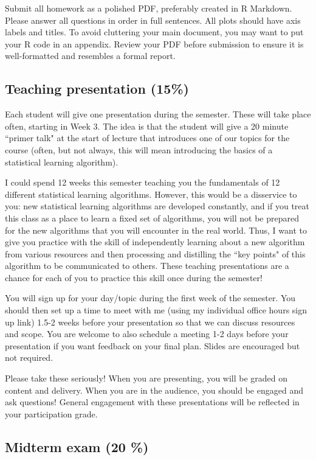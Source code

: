 \documentclass[11pt]{article}
\begin{document}
Submit all homework as a polished PDF, preferably created in R Markdown. Please answer all questions in order in full sentences. All plots should have axis labels and titles. To avoid cluttering your main document, you may want to put your R code in an appendix. Review your PDF before submission to ensure it is well-formatted and resembles a formal report. 
  
\subsection{Teaching presentation (15\%)}

Each student will give one presentation during the semester. These will take place often, starting in Week 3. The idea is that the student will give a 20 minute ``primer talk" at the start of lecture that introduces one of our topics for the course (often, but not always, this will mean introducing the basics of a statistical learning algorithm). 

I could spend 12 weeks this semester teaching you the fundamentals of 12 different statistical learning algorithms. However, this would be a disservice to you: new statistical learning algorithms are developed constantly, and if you treat this class as a place to learn a fixed set of algorithms, you will not be prepared for the new algorithms that you will encounter in the real world. Thus, I want to give you practice with the skill of independently learning about a new algorithm from various resources and then processing and distilling the ``key points" of this algorithm to be communicated to others. These teaching presentations are a chance for each of you to practice this skill once during the semester! 

You will sign up for your day/topic during the first week of the semester. You should then set up a time to meet with me (using my individual office hours sign up link) 1.5-2 weeks before your presentation so that we can discuss resources and scope. You are welcome to also schedule a meeting 1-2 days before your presentation if you want feedback on your final plan. Slides are encouraged but not required. 

Please take these seriously! When you are presenting, you will be graded on content and delivery. When you are in the audience, you should be engaged and ask questions! General engagement with these presentations will be reflected in your participation grade.


\subsection{Midterm exam (20 \%)}
\end{document}
